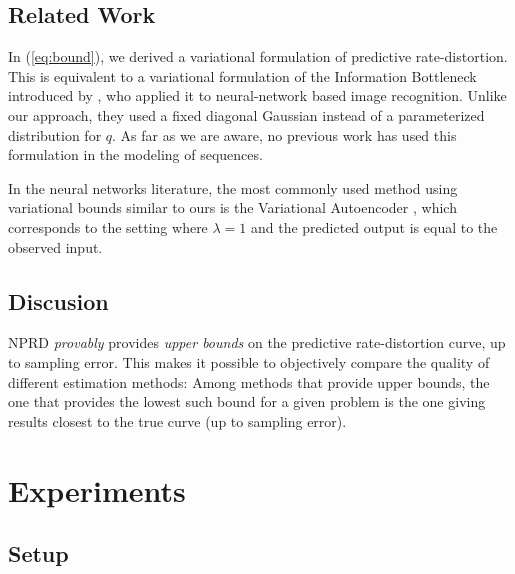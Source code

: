 \documentclass[11pt,letterpaper]{article}
\begin{document}
\subsection{Related Work}
In (\ref{eq:bound}), we derived a variational formulation of predictive rate-distortion.
This is equivalent to a variational formulation of the Information Bottleneck introduced by \cite{alemi-deep-2016}, who applied it to neural-network based image recognition.
Unlike our approach, they used a fixed diagonal Gaussian instead of a parameterized distribution for $q$.
As far as we are aware, no previous work has used this formulation in the modeling of sequences.

In the neural networks literature, the most commonly used method using variational bounds similar to ours is the Variational Autoencoder \citep{kingma-auto-encoding-2014}, which corresponds to the setting where $\lambda=1$ and the predicted output is equal to the observed input.



\subsection{Discusion}

NPRD \emph{provably} provides \emph{upper bounds} on the predictive rate-distortion curve, up to sampling error.
This makes it possible to objectively compare the quality of different estimation methods:
Among methods that provide upper bounds, the one that provides the lowest such bound for a given problem is the one giving results closest to the true curve (up to sampling error).

\section{Experiments}\label{sec:experiments}

\subsection{Setup}
\end{document}
